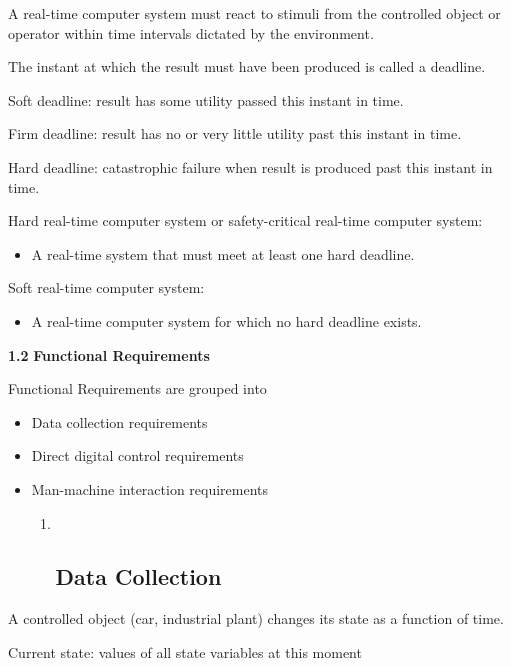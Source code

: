 A real-time computer system must react to stimuli from the controlled
object or operator within time intervals dictated by the environment.

The instant at which the result must have been produced is called a
deadline.

Soft deadline: result has some utility passed this instant in time.

Firm deadline: result has no or very little utility past this instant in
time.

Hard deadline: catastrophic failure when result is produced past this
instant in time.

Hard real-time computer system or safety-critical real-time computer
system:

\begin{itemize}
\item
  A real-time system that must meet at least one hard deadline.
\end{itemize}

Soft real-time computer system:

\begin{itemize}
\item
  A real-time computer system for which no hard deadline exists.
\end{itemize}

\textbf{1.2} \protect\hypertarget{teil3}{}{}\textbf{Functional
Requirements}

Functional Requirements are grouped into

\begin{itemize}
\item
  Data collection requirements
\item
  Direct digital control requirements
\item
  Man-machine interaction requirements

  \begin{enumerate}
  \item ~
    \subsection{Data Collection}\label{data-collection}
  \end{enumerate}
\end{itemize}

A controlled object (car, industrial plant) changes its state as a
function of time.

Current state: values of all state variables at this moment

